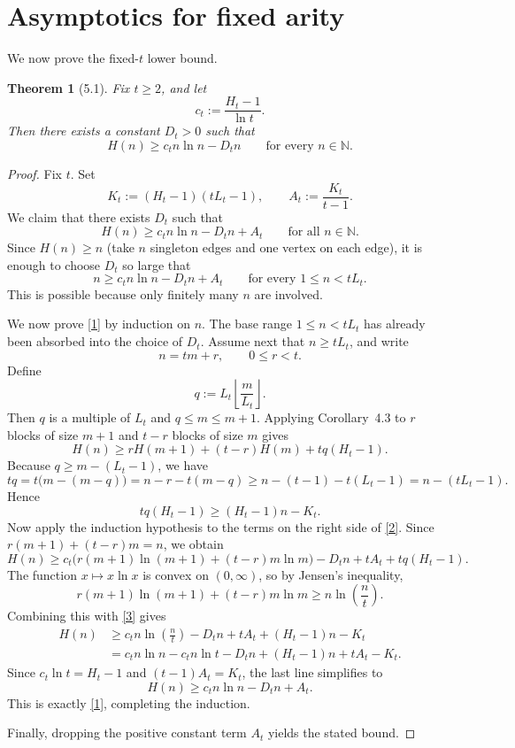 \documentclass[11pt]{article}
\newtheorem{theorem}{Theorem}[section]
\begin{document}
\section{Asymptotics for fixed arity}

We now prove the fixed-$t$ lower bound.

\begin{theorem}[5.1]
Fix $t \ge 2$, and let
\[
c_t := \frac{H_t - 1}{\ln t}.
\]
Then there exists a constant $D_t > 0$ such that
\[
H(n) \ge c_t n \ln n - D_t n \qquad \text{for every } n \in \mathbb N.
\]
\end{theorem}

\begin{proof}
Fix $t$. Set
\[
K_t := (H_t - 1)(tL_t - 1), \qquad A_t := \frac{K_t}{t-1}.
\]
We claim that there exists $D_t$ such that
\begin{equation}
H(n) \ge c_t n \ln n - D_t n + A_t \qquad \text{for all } n \in \mathbb N. \tag{1}
\end{equation}
Since $H(n) \ge n$ (take $n$ singleton edges and one vertex on each edge), it is enough to choose $D_t$ so large that
\[
n \ge c_t n \ln n - D_t n + A_t \qquad \text{for every } 1 \le n < tL_t.
\]
This is possible because only finitely many $n$ are involved.

We now prove \eqref{1} by induction on $n$. The base range $1 \le n < tL_t$ has already been absorbed into the choice of $D_t$. Assume next that $n \ge tL_t$, and write
\[
n = tm + r, \qquad 0 \le r < t.
\]
Define
\[
q := L_t \left\lfloor \frac{m}{L_t} \right\rfloor.
\]
Then $q$ is a multiple of $L_t$ and $q \le m \le m+1$. Applying Corollary~4.3 to $r$ blocks of size $m+1$ and $t-r$ blocks of size $m$ gives
\begin{equation}
H(n) \ge rH(m+1) + (t-r)H(m) + tq(H_t - 1). \tag{2}
\end{equation}
Because $q \ge m - (L_t - 1)$, we have
\[
tq = t\bigl(m - (m-q)\bigr) = n-r-t(m-q) \ge n-(t-1)-t(L_t-1) = n-(tL_t-1).
\]
Hence
\begin{equation}
tq(H_t - 1) \ge (H_t - 1)n - K_t. \tag{3}
\end{equation}
Now apply the induction hypothesis to the terms on the right side of \eqref{2}. Since $r(m+1) + (t-r)m = n$, we obtain
\[
H(n) \ge c_t\bigl(r(m+1)\ln(m+1) + (t-r)m\ln m\bigr) - D_t n + tA_t + tq(H_t - 1).
\]
The function $x \mapsto x\ln x$ is convex on $(0,\infty)$, so by Jensen's inequality,
\[
r(m+1)\ln(m+1) + (t-r)m\ln m \ge n\ln\left(\frac{n}{t}\right).
\]
Combining this with \eqref{3} gives
\begin{align*}
H(n)
&\ge c_t n \ln\left(\frac nt\right) - D_t n + tA_t + (H_t - 1)n - K_t \\
&= c_t n \ln n - c_t n \ln t - D_t n + (H_t - 1)n + tA_t - K_t.
\end{align*}
Since $c_t \ln t = H_t - 1$ and $(t-1)A_t = K_t$, the last line simplifies to
\[
H(n) \ge c_t n \ln n - D_t n + A_t.
\]
This is exactly \eqref{1}, completing the induction.

Finally, dropping the positive constant term $A_t$ yields the stated bound.
\end{proof}
\end{document}

